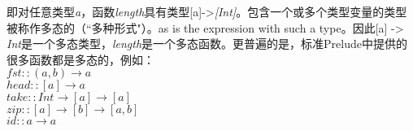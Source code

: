 即对任意类型\textit{a}，函数\textit{length}具有类型[a]->\textit{[Int]}。包含一个或多个类型变量的类型被称作多态的（“多种形式"）。as
is the expression with such a type。因此[a] -> \textit{Int}是一个多态类型，\textit{length}是一个多态函数。更普遍的是，标准Prelude中提供的很多函数都是多态的，例如：\\
\hspace*{1cm} $fst :: (a, b) \rightarrow a$\\
\hspace*{1cm} $head :: [a] \rightarrow a$\\
\hspace*{1cm} $take :: Int \rightarrow [a] \rightarrow [a]$\\
\hspace*{1cm} $zip :: [a] \rightarrow [b] \rightarrow [a, b]$\\
\hspace*{1cm} $id :: a \rightarrow a$


